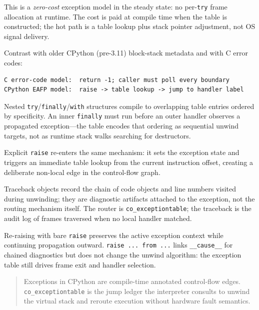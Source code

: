 This is a \emph{zero-cost} exception model in the steady state: no per-\texttt{try} frame allocation at runtime. The cost is paid at compile time when the table is constructed; the hot path is a table lookup plus stack pointer adjustment, not OS signal delivery.

Contrast with older CPython (pre-3.11) block-stack metadata and with C error codes:

\begin{verbatim}
C error-code model:  return -1; caller must poll every boundary
CPython EAFP model:  raise -> table lookup -> jump to handler label
\end{verbatim}

Nested \texttt{try}/\texttt{finally}/\texttt{with} structures compile to overlapping table entries ordered by specificity. An inner \texttt{finally} must run before an outer handler observes a propagated exception---the table encodes that ordering as sequential unwind targets, not as runtime stack walks searching for destructors.

Explicit \texttt{raise} re-enters the same mechanism: it sets the exception state and triggers an immediate table lookup from the current instruction offset, creating a deliberate non-local edge in the control-flow graph.

Traceback objects record the chain of code objects and line numbers visited during unwinding; they are diagnostic artifacts attached to the exception, not the routing mechanism itself. The router is \texttt{co\_exceptiontable}; the traceback is the audit log of frames traversed when no local handler matched.

Re-raising with bare \texttt{raise} preserves the active exception context while continuing propagation outward. \texttt{raise ... from ...} links \texttt{\_\_cause\_\_} for chained diagnostics but does not change the unwind algorithm: the exception table still drives frame exit and handler selection.

\begin{quote}
Exceptions in CPython are compile-time annotated control-flow edges. \texttt{co\_exceptiontable} is the jump ledger the interpreter consults to unwind the virtual stack and reroute execution without hardware fault semantics.
\end{quote}
